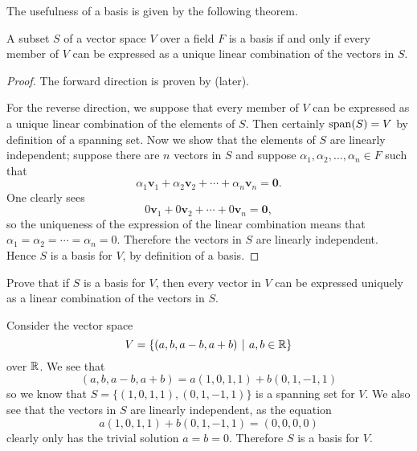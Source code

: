The usefulness of a basis is given by the following theorem.

\begin{theorem}\label{thrm-basis-iff-has-unique-linear-combinatio}
    A subset $S$ of a vector space $V$ over a field $F$ is a basis if and only if every member of $V$ can be expressed as a unique linear combination of the vectors in $S$.
\end{theorem}
\begin{proof}
    The forward direction is proven by  (later).

    For the reverse direction, we suppose that every member of $V$ can be expressed as a unique linear combination of the elements of $S$. Then certainly $\mathrm{span}(S) = V$ by definition of a spanning set. Now we show that the elements of $S$ are linearly independent; suppose there are $n$ vectors in $S$ and suppose $\alpha_1, \alpha_2, \dots, \alpha_n \in F$ such that
    \[
        \alpha_1\textbf{v}_1 + \alpha_2\textbf{v}_2 + \cdots + \alpha_n\textbf{v}_n = \textbf{0}.
    \]
    One clearly sees
    \[
        0\textbf{v}_1 + 0\textbf{v}_2 + \cdots + 0\textbf{v}_n = \textbf{0},
    \]
    so the uniqueness of the expression of the linear combination means that $\alpha_1 = \alpha_2 = \cdots = \alpha_n = 0$. Therefore the vectors in $S$ are linearly independent. Hence $S$ is a basis for $V$, by definition of a basis.
\end{proof}

\begin{exercise}\label{exercise-basis-means-unique-linear-combination}
    Prove that if $S$ is a basis for $V$, then every vector in $V$ can be expressed uniquely as a linear combination of the vectors in $S$.
\end{exercise}

\begin{example}
    Consider the vector space
    \[
        V = \{(a, b, a-b, a+b) \vert a, b \in \R\}
    \]
    over $\mathbb{R}$. We see that
    \[
        (a, b, a-b, a+b) = a(1, 0, 1, 1) + b(0, 1, -1, 1)
    \]
    so we know that $S = \{(1, 0, 1, 1), (0, 1, -1, 1)\}$ is a spanning set for $V$. We also see that the vectors in $S$ are linearly independent, as the equation
    \[
        a(1, 0, 1, 1) + b(0, 1, -1, 1) = (0, 0, 0, 0)
    \]
    clearly only has the trivial solution $a = b = 0$. Therefore $S$ is a basis for $V$.
\end{example}

